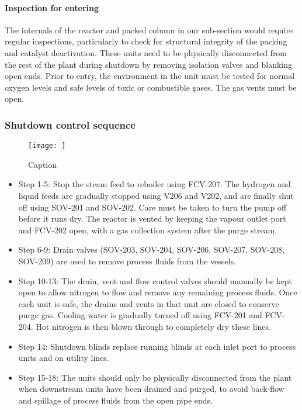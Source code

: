 \paragraph{Inspection for entering}
The internals of the reactor and packed column in our sub-section would require regular inspections, particularly to check for structural integrity of the packing and catalyst deactivation. These units need to be physically disconnected from the rest of the plant during shutdown by removing isolation valves and blanking open ends. Prior to entry, the environment in the unit must be tested for normal oxygen levels and safe levels of toxic or combustible gases. The gas vents must be open. 


\subsubsection{Shutdown control sequence}
\begin{figure}[H]
    \centering
    \texttt{[image: ]}
    \caption{Caption}
    \label{fig:shutdown}
\end{figure}

\begin{itemize}
    \item Step 1-5: Stop the steam feed to reboiler using FCV-207. The hydrogen and liquid feeds are gradually stopped using V206 and V202, and are finally shut off using SOV-201 and SOV-202. Care must be taken to turn the pump off before it runs dry. The reactor is vented by keeping the vapour outlet port and FCV-202 open, with a gas collection system after the purge stream.
    \item Step 6-9: Drain valves (SOV-203, SOV-204, SOV-206, SOV-207, SOV-208, SOV-209) are used to remove process fluids from the vessels.
    \item Step 10-13: The drain, vent and flow control valves should manually be kept open to allow nitrogen to flow and remove any remaining process fluids. Once each unit is safe, the drains and vents in that unit are closed to conserve purge gas. Cooling water is gradually turned off using FCV-201 and FCV-204. Hot nitrogen is then blown through to completely dry these lines.
    \item Step 14: Shutdown blinds replace running blinds at each inlet port to process units and on utility lines.
    \item Step 15-18: The units should only be physically disconnected from the plant when downstream units have been drained and purged, to avoid back-flow and spillage of process fluids from the open pipe ends.
\end{itemize}